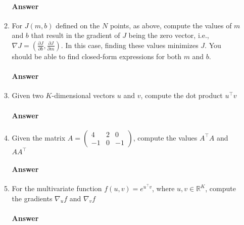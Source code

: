 \documentclass[12pt]{article}
\begin{document}
\begin{enumerate}
\begin{enumerate}
  \paragraph{Answer} 

  \item For $J(m,b)$ defined on the $N$ points, as above, compute the values of $m$ and 
        $b$ that result in the gradient of $J$ being the zero vector, i.e., 
        $\nabla J = (\frac{\partial J}{\partial b}, \frac{\partial J}{\partial m})$.
        In this case, finding these values minimizes $J$. You should be able to find 
        closed-form expressions for both $m$ and $b$.\\
  \vspace{-2.5em}
  \paragraph{Answer}

  \item Given two $K$-dimensional vectors $u$ and $v$, compute the dot product $u^{\top}v$\\
  \vspace{-2.5em}
  \paragraph{Answer}

  \item Given the matrix $A = 
        \begin{pmatrix}
          4   & 2 & 0 \\
          -1  & 0 & -1
        \end{pmatrix}$, compute the values $A^{\top}A$ and $AA^{\top}$\\
  \vspace{-2.5em}
  \paragraph{Answer}

  \item For the multivariate function $f(u,v) = e^{u^{\top}v}$, where $u, v \in \mathbb{R}^K$,
        compute the gradients $\nabla_u f$ and $\nabla_v f$ \\
  \vspace{-2.5em}
  \paragraph{Answer}
  \end{enumerate}
\newpage


\end{enumerate}
\end{document}
